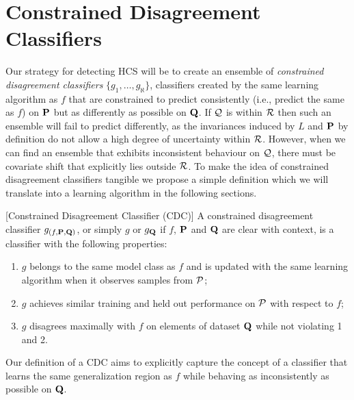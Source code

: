 \section{Constrained Disagreement Classifiers}\label{sec:constrained-disagreement-classifier-(cdc)}
Our strategy for detecting HCS will be to create an ensemble of \textit{constrained disagreement classifiers} $\{g_1, \ldots, g_\aleph \}$,
classifiers created by the same learning algorithm as $f$ that are constrained to predict consistently (i.e., predict the same as $f$) on $\mathbf{P}$ but as differently as possible on $\mathbf{Q}$.
If $\mathcal{Q}$ is within $\mathcal{R}$ then such an ensemble will fail to predict differently, as the invariances induced by $L$ and $\mathbf{P}$ by definition do not allow a high degree of uncertainty within $\mathcal{R}$.
However, when we can find an ensemble that exhibits inconsistent behaviour on $\mathcal{Q}$, there must be covariate shift that explicitly lies outside $\mathcal{R}$.
To make the idea of constrained disagreement classifiers tangible we propose a simple definition which we will translate into a learning algorithm in the following sections.

\begin{definition}
    \label{def:cdc}
    [Constrained Disagreement Classifier (CDC)]
    A constrained disagreement classifier $g_{(f, \mathbf{P}, \mathbf{Q})}$, or simply $g$ or $g_{\mathbf{Q}}$ if $f$, $\mathbf{P}$ and $\mathbf{Q}$ are clear with context, is a classifier with the following properties:
    \begin{enumerate}
        \item $g$ belongs to the same model class as $f$ and is updated with the same learning algorithm when it observes samples from $\mathcal{P}$;
        \item $g$ achieves similar training and held out performance on $\mathcal{P}$ with respect to $f$;
        \item $g$ disagrees maximally with $f$ on elements of dataset $\mathbf{Q}$ while not violating 1 and 2.
    \end{enumerate}
    Our definition of a CDC aims to explicitly capture the concept of a classifier that learns the same generalization region as $f$ while behaving as inconsistently as possible on $\mathbf{Q}$.
\end{definition}



